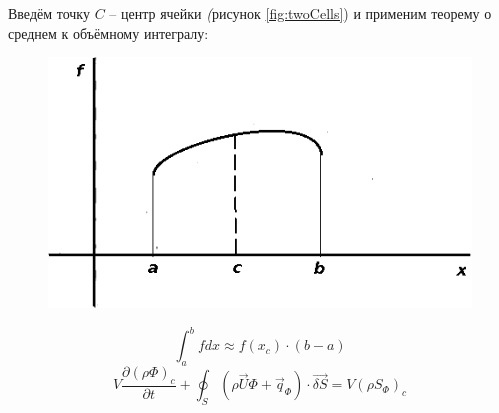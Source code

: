		Введём точку $C$ -- центр ячейки \textit(рисунок \ref{fig:twoCells}) и применим теорему о среднем к объёмному интегралу:
		\begin{figure}[h]
			\begin{minipage}{0.43\linewidth}
				\includegraphics[scale=0.5]{meanValueTheorem}
				\label{fig:meanValueTheorem}
			\end{minipage}
			\hspace{-1em}
			\begin{minipage}{0.6\linewidth}
				\begin{equation}
					\int_a^b fdx \approx f(x_c) \cdot (b-a)
				\end{equation}
				\begin{equation}
					V \frac{\partial \left(\rho \Phi\right)_c}{\partial t} + \oint_S \left( \rho \vec{U} \Phi + \vec{q}_{\Phi}  \right)\cdot \vec{\delta S} = V \left( \rho S_{\Phi} \right)_c
				\end{equation}
				\vspace{2em}
			\end{minipage}
		\end{figure}
			\vspace{-1em}
					
